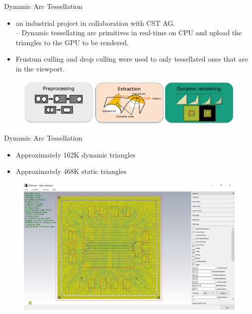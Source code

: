 \documentclass{beamer}
\begin{document}
\begin{frame}{Dynamic Arc Tessellation}
	\begin{itemize}
		\item an industrial project in collaboration with CST AG.\\
		-- Dynamic tessellating arc primitives in real-time on CPU and upload the triangles to the GPU to be rendered.
		\item Frustum culling and drop culling were used to only tessellated ones that are in the viewport.
	\end{itemize}
	\begin{figure}
		\centering
		\includegraphics[height=0.3\textheight]{figures/arcpipeline}
	\end{figure}
\end{frame}

\begin{frame}{Dynamic Arc Tessellation}
	\begin{itemize}
		\item Approximately 162K dynamic triangles
		\item Approximately 468K static triangles
	\end{itemize}
	\begin{figure}
		\centering
		\includegraphics[width=0.8\linewidth]{figures/cst1}
	\end{figure}
\end{frame}
\end{document}
